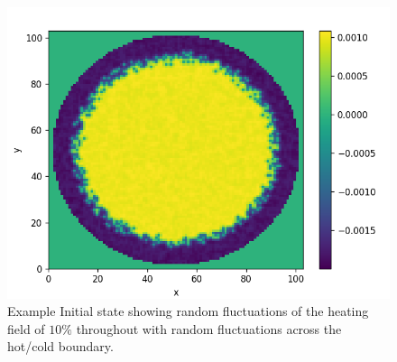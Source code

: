 \documentclass{article}
\begin{document}
\begin{figure}[H]
	\centering
	\includegraphics[scale=1.5]{initialState.png}
	\caption{Example Initial state showing random fluctuations of the heating field of $10 \%$ throughout with random fluctuations across the hot/cold boundary. }
	\label{LBM initial state}
\end{figure}
\end{document}
